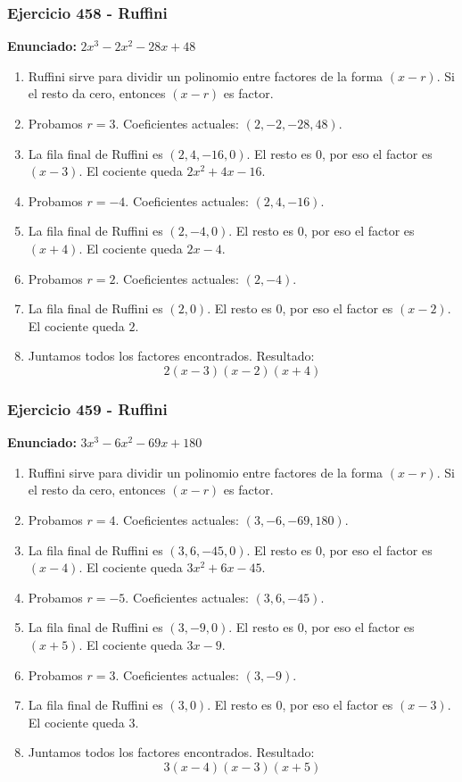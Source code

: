\documentclass[11pt,a4paper]{article}
\begin{document}
\subsubsection*{Ejercicio 458 - Ruffini}
\textbf{Enunciado:} $ 2 x^{3} - 2 x^{2} - 28 x + 48 $\par
\begin{enumerate}[leftmargin=2em]
\item Ruffini sirve para dividir un polinomio entre factores de la forma \((x-r)\). Si el resto da cero, entonces \((x-r)\) es factor.
\item Probamos \(r=3\). Coeficientes actuales: \((2, -2, -28, 48)\).
\item La fila final de Ruffini es \((2, 4, -16, 0)\). El resto es \(0\), por eso el factor es \((x-3)\). El cociente queda \(2 x^{2} + 4 x - 16\).
\item Probamos \(r=-4\). Coeficientes actuales: \((2, 4, -16)\).
\item La fila final de Ruffini es \((2, -4, 0)\). El resto es \(0\), por eso el factor es \((x+4)\). El cociente queda \(2 x - 4\).
\item Probamos \(r=2\). Coeficientes actuales: \((2, -4)\).
\item La fila final de Ruffini es \((2, 0)\). El resto es \(0\), por eso el factor es \((x-2)\). El cociente queda \(2\).
\item Juntamos todos los factores encontrados. Resultado: \[\boxed{2 \left(x - 3\right) \left(x - 2\right) \left(x + 4\right)}\]
\end{enumerate}

\vspace{0.2cm}
\subsubsection*{Ejercicio 459 - Ruffini}
\textbf{Enunciado:} $ 3 x^{3} - 6 x^{2} - 69 x + 180 $\par
\begin{enumerate}[leftmargin=2em]
\item Ruffini sirve para dividir un polinomio entre factores de la forma \((x-r)\). Si el resto da cero, entonces \((x-r)\) es factor.
\item Probamos \(r=4\). Coeficientes actuales: \((3, -6, -69, 180)\).
\item La fila final de Ruffini es \((3, 6, -45, 0)\). El resto es \(0\), por eso el factor es \((x-4)\). El cociente queda \(3 x^{2} + 6 x - 45\).
\item Probamos \(r=-5\). Coeficientes actuales: \((3, 6, -45)\).
\item La fila final de Ruffini es \((3, -9, 0)\). El resto es \(0\), por eso el factor es \((x+5)\). El cociente queda \(3 x - 9\).
\item Probamos \(r=3\). Coeficientes actuales: \((3, -9)\).
\item La fila final de Ruffini es \((3, 0)\). El resto es \(0\), por eso el factor es \((x-3)\). El cociente queda \(3\).
\item Juntamos todos los factores encontrados. Resultado: \[\boxed{3 \left(x - 4\right) \left(x - 3\right) \left(x + 5\right)}\]
\end{enumerate}
\end{document}
